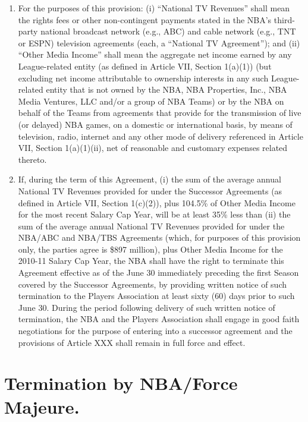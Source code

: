 \documentclass[
]{book}
\providecommand{\tightlist}{%
  \setlength{\itemsep}{0pt}\setlength{\parskip}{0pt}}
\begin{document}
\begin{enumerate}
\def\labelenumi{(\alph{enumi})}
\tightlist
\item
  For the purposes of this provision: (i) ``National TV Revenues'' shall mean the rights fees or other non-contingent payments stated in the NBA's third-party national broadcast network (e.g., ABC) and cable network (e.g., TNT or ESPN) television agreements (each, a ``National TV Agreement''); and (ii) ``Other Media Income'' shall mean the aggregate net income earned by any League-related entity (as defined in Article VII, Section 1(a)(1)) (but excluding net income attributable to ownership interests in any such League-related entity that is not owned by the NBA, NBA Properties, Inc., NBA Media Ventures, LLC and/or a group of NBA Teams) or by the NBA on behalf of the Teams from agreements that provide for the transmission of live (or delayed) NBA games, on a domestic or international basis, by means of television, radio, internet and any other mode of delivery referenced in Article VII, Section 1(a)(1)(ii), net of reasonable and customary expenses related thereto.
\item
  If, during the term of this Agreement, (i) the sum of the average annual National TV Revenues provided for under the Successor Agreements (as defined in Article VII, Section 1(c)(2)), plus 104.5\% of Other Media Income for the most recent Salary Cap Year, will be at least 35\% less than (ii) the sum of the average annual National TV Revenues provided for under the NBA/ABC and NBA/TBS Agreements (which, for purposes of this provision only, the parties agree is \$897 million), plus Other Media Income for the 2010-11 Salary Cap Year, the NBA shall have the right to terminate this Agreement effective as of the June 30 immediately preceding the first Season covered by the Successor Agreements, by providing written notice of such termination to the Players Association at least sixty (60) days prior to such June 30. During the period following delivery of such written notice of termination, the NBA and the Players Association shall engage in good faith negotiations for the purpose of entering into a successor agreement and the provisions of Article XXX shall remain in full force and effect.
\end{enumerate}

\hypertarget{termination-by-nbaforce-majeure.}{%
\section{Termination by NBA/Force Majeure.}\label{termination-by-nbaforce-majeure.}}
\end{document}
